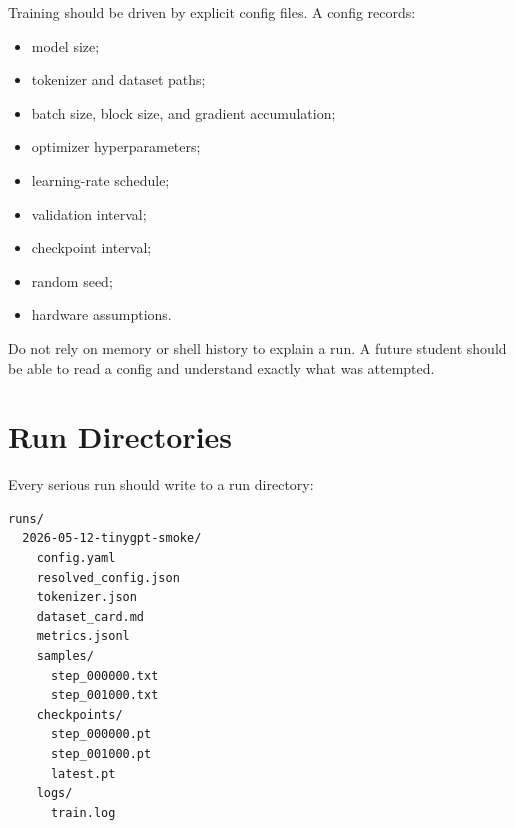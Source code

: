 Training should be driven by explicit config files. A config records:

\begin{itemize}
  \item model size;
  \item tokenizer and dataset paths;
  \item batch size, block size, and gradient accumulation;
  \item optimizer hyperparameters;
  \item learning-rate schedule;
  \item validation interval;
  \item checkpoint interval;
  \item random seed;
  \item hardware assumptions.
\end{itemize}

\begin{center}
\end{center}

Do not rely on memory or shell history to explain a run. A future student should be able to read a config and understand exactly what was attempted.

\section{Run Directories}

Every serious run should write to a run directory:

\begin{lstlisting}
runs/
  2026-05-12-tinygpt-smoke/
    config.yaml
    resolved_config.json
    tokenizer.json
    dataset_card.md
    metrics.jsonl
    samples/
      step_000000.txt
      step_001000.txt
    checkpoints/
      step_000000.pt
      step_001000.pt
      latest.pt
    logs/
      train.log
\end{lstlisting}

